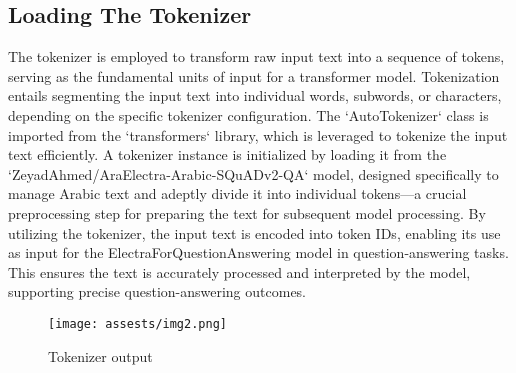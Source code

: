 \documentclass[conference]{IEEEtran}
\begin{document}
\subsection{Loading The Tokenizer}
The tokenizer is employed to transform raw input text into a sequence of tokens, serving as the fundamental units of input for a transformer model. Tokenization entails segmenting the input text into individual words, subwords, or characters, depending on the specific tokenizer configuration. The `AutoTokenizer` class is imported from the `transformers` library, which is leveraged to tokenize the input text efficiently. A tokenizer instance is initialized by loading it from the `ZeyadAhmed/AraElectra-Arabic-SQuADv2-QA` model, designed specifically to manage Arabic text and adeptly divide it into individual tokens—a crucial preprocessing step for preparing the text for subsequent model processing. By utilizing the tokenizer, the input text is encoded into token IDs, enabling its use as input for the ElectraForQuestionAnswering model in question-answering tasks. This ensures the text is accurately processed and interpreted by the model, supporting precise question-answering outcomes.
\begin{figure}[H]
  \centering
  \texttt{[image: assests/img2.png]}
  \caption{Tokenizer output}
  \label{fig:Tokenize routput}
\end{figure}
\end{document}
